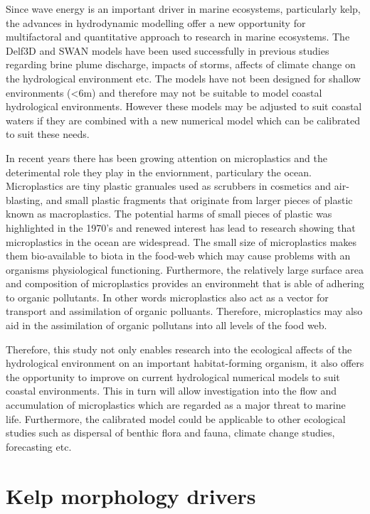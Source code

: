 \documentclass[]{article}
\begin{document}
Since wave energy is an important driver in marine ecosystems,
particularly kelp, the advances in hydrodynamic modelling offer a new
opportunity for multifactoral and quantitative approach to research in
marine ecosystems. The Delf3D and SWAN models have been used
successfully in previous studies regarding brine plume discharge,
impacts of storms, affects of climate change on the hydrological
environment etc. The models have not been designed for shallow
environments (\textless{}6m) and therefore may not be suitable to model
coastal hydrological environments. However these models may be adjusted
to suit coastal waters if they are combined with a new numerical model
which can be calibrated to suit these needs.

In recent years there has been growing attention on microplastics and
the deterimental role they play in the enviornment, particulary the
ocean. Microplastics are tiny plastic granuales used as scrubbers in
cosmetics and air-blasting, and small plastic fragments that originate
from larger pieces of plastic known as macroplastics. The potential
harms of small pieces of plastic was highlighted in the 1970's and
renewed interest has lead to research showing that microplastics in the
ocean are widespread. The small size of microplastics makes them
bio-available to biota in the food-web which may cause problems with an
organisms physiological functioning. Furthermore, the relatively large
surface area and composition of microplastics provides an environmeht
that is able of adhering to organic pollutants. In other words
microplastics also act as a vector for transport and assimilation of
organic polluants. Therefore, microplastics may also aid in the
assimilation of organic pollutans into all levels of the food web.

Therefore, this study not only enables research into the ecological
affects of the hydrological environment on an important habitat-forming
organism, it also offers the opportunity to improve on current
hydrological numerical models to suit coastal environments. This in turn
will allow investigation into the flow and accumulation of microplastics
which are regarded as a major threat to marine life. Furthermore, the
calibrated model could be applicable to other ecological studies such as
dispersal of benthic flora and fauna, climate change studies,
forecasting etc.

\section{Kelp morphology drivers}\label{kelp-morphology-drivers}
\end{document}
